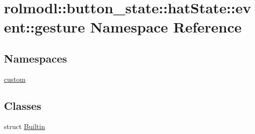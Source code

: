 \hypertarget{namespacerolmodl_1_1button__state_1_1hat_state_1_1event_1_1gesture}{}\section{rolmodl\+::button\+\_\+state\+::hat\+State\+::event\+::gesture Namespace Reference}
\label{namespacerolmodl_1_1button__state_1_1hat_state_1_1event_1_1gesture}
\subsection*{Namespaces}
\begin{DoxyCompactItemize}
\item 
 \mbox{\hyperlink{namespacerolmodl_1_1button__state_1_1hat_state_1_1event_1_1gesture_1_1custom}{custom}}
\end{DoxyCompactItemize}
\subsection*{Classes}
\begin{DoxyCompactItemize}
\item 
struct \mbox{\hyperlink{structrolmodl_1_1button__state_1_1hat_state_1_1event_1_1gesture_1_1_builtin}{Builtin}}
\end{DoxyCompactItemize}
